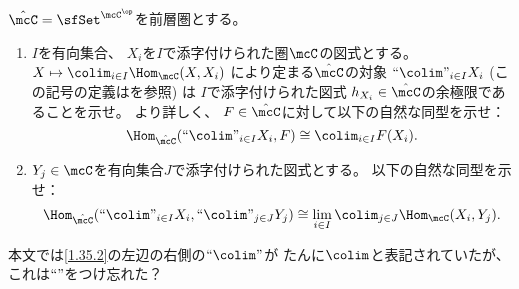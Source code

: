 \documentclass[uplatex,dvipdfmx]{jsarticle}
\begin{document}
\maketitle\HeaderCommentA
\section{}
\fi

\begin{prob}\label{1.35}
  \(\hat{\mcC} = \sfSet^{\mcC^{\op}}\)を前層圏とする。
  \begin{enumerate}
    \item \label{1.35.1}
    \(I\)を有向集合、
    \(X_i\)を\(I\)で添字付けられた圏\(\mcC\)の図式とする。
    \(X\mapsto \colim_{i\in I}\Hom_{\mcC}(X,X_i)\)
    により定まる\(\hat{\mcC}\)の対象
    \(``\colim"_{i\in I} X_i\)
    (この記号の定義は\cite[Definition 1.11.4]{kashiwara2002sheaves}を参照) は
    \(I\)で添字付けられた図式
    \(h_{X_i}\in \hat{\mcC}\)の余極限であることを示せ。
    より詳しく、
    \(F\in \hat{\mcC}\)に対して以下の自然な同型を示せ：
    \[
    \Hom_{\hat{\mcC}}(``\colim"_{i\in I} X_i, F) \cong \colim_{i\in I} F(X_i).
    \]
    \item \label{1.35.2}
    \(Y_j\in \mcC\)を有向集合\(J\)で添字付けられた図式とする。
    以下の自然な同型を示せ：
    \[
    \Hom_{\hat{\mcC}}(``\colim"_{i\in I} X_i, ``\colim"_{j\in J} Y_j)
    \cong \lim_{i\in I}\colim_{j\in J}\Hom_{\mcC}(X_i,Y_j).
    \]
  \end{enumerate}
\end{prob}

\begin{rem*}
  本文では\ref{1.35.2}の左辺の右側の\(``\colim"\)が
  たんに\(\colim\)と表記されていたが、これは\(``"\)をつけ忘れた？
\end{rem*}
\end{document}
